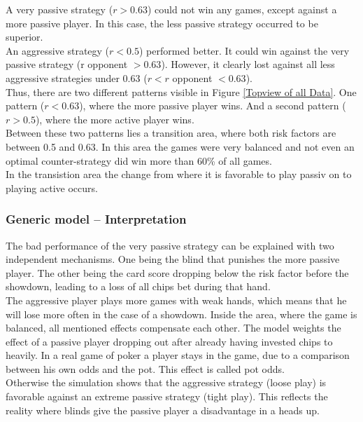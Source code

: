 \documentclass[11pt]{article}
\begin{document}
%
A very passive strategy ($r > 0.63$) could not win any games, except against a more passive player. In this case, the less passive strategy occurred to be superior.\\
%

An aggressive strategy ($r < 0.5$) performed better. It could win against the very passive strategy (r opponent $> 0.63$). However, it clearly lost against all less aggressive strategies under 0.63 ($r < r$ opponent $< 0.63$).\\

Thus, there are two different patterns visible in Figure \ref{Topview of all Data}. One pattern ($r <0.63$), where the more passive player wins. And a second pattern ($r>0.5$), where the more active player wins.\\

Between these two patterns lies a transition area, where both risk factors are between 0.5 and 0.63. In this area the games were very balanced and not even an optimal counter-strategy did win more than 60\% of all games.\\

In the transistion area the change from where it is favorable to play passiv on to playing active occurs.

 \subsubsection{Generic model -- Interpretation}

The bad performance of the very passive strategy can be explained with two independent mechanisms. One being the blind that punishes the more passive player. The other being the card score dropping below the risk factor before the showdown, leading to a loss of all chips bet during that hand.\\

The aggressive player plays more games with weak hands, which means that he will lose more often in the case of a showdown.
Inside the area, where the game is balanced, all mentioned effects compensate each other.
The model weights the effect of a passive player dropping out after already having invested chips to heavily. In a real game of poker a player stays in the game, due to a comparison between his own odds and the pot. This effect is called pot odds.\\

Otherwise the simulation shows that the aggressive strategy (loose play) is favorable against an extreme passive strategy (tight play). This reflects the reality where blinds give the passive player a disadvantage in a heads up.\\
\end{document}
